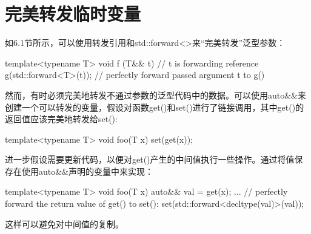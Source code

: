 \section{完美转发临时变量}
如6.1节所示，可以使用转发引用和std::forward<>来“完美转发”泛型参数：

\begin{cpp}
template<typename T>
void f (T&& t) // t is forwarding reference
{
	g(std::forward<T>(t)); // perfectly forward passed argument t to g()
}
\end{cpp}

然而，有时必须完美地转发不通过参数的泛型代码中的数据。可以使用auto\&\&来创建一个可以转发的变量，假设对函数get()和set()进行了链接调用，其中get()的返回值应该完美地转发给set():

\begin{cpp}
template<typename T>
void foo(T x)
{
	set(get(x));
}
\end{cpp}

进一步假设需要更新代码，以便对get()产生的中间值执行一些操作。通过将值保存在使用auto\&\&声明的变量中来实现：

\begin{cpp}
template<typename T>
void foo(T x)
{
	auto&& val = get(x);
	...
	// perfectly forward the return value of get() to set():
	set(std::forward<decltype(val)>(val));
}
\end{cpp}

这样可以避免对中间值的复制。








































